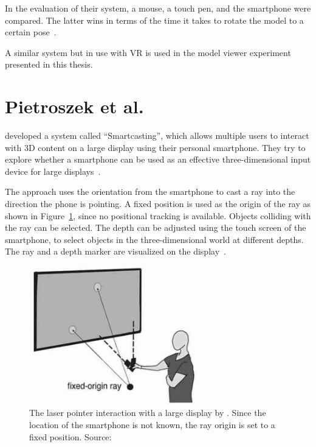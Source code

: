 In the evaluation of their system, a mouse, a touch pen, and the smartphone were compared. The latter wins in terms of the time it takes to rotate the model to a certain pose~\cite[140]{Katzakis.2010}.

A similar system but in use with \gls{VR} is used in the model viewer experiment presented in this thesis.

\section{Pietroszek et al.}\label{section:pietroszek-2014}
\citeauthor{Pietroszek.2014} developed a system called \enquote{Smartcasting}, which allows multiple users to interact with 3D content on a large display using their personal smartphone. They try to explore whether a smartphone can be used as an effective three-dimensional input device for large displays~\cite[119]{Pietroszek.2014}.

The approach uses the orientation from the smartphone to cast a ray into the direction the phone is pointing. A fixed position is used as the origin of the ray as shown in Figure~\ref{fig:pietroszek-2014}, since no positional tracking is available. Objects colliding with the ray can be selected. The depth can be adjusted using the touch screen of the smartphone, to select objects in the three-dimensional world at different depths. The ray and a depth marker are visualized on the display~\cite[121]{Pietroszek.2014}.

\begin{figure}[H]%
  \centering%
  \includegraphics[height=6cm]{figures/related_work/pietroszek_2014_laser_pointer.png}%
  \caption[Laser pointer implementation by Pietroszek et al.]{
  The laser pointer interaction with a large display by \citeauthor{Pietroszek.2014}. Since the location of the smartphone is not known, the ray origin is set to a fixed position.
  \newline{}
  Source:~\cite[Figure 3]{Pietroszek.2014}}\label{fig:pietroszek-2014}
\end{figure}

